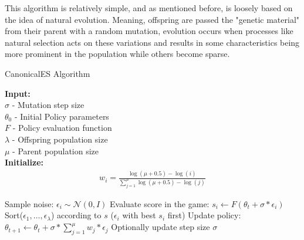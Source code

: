 \documentclass[11 pt, twocolumn]{article}
\begin{document}
This algorithm is relatively simple, and as mentioned before, is loosely based on the idea of natural evolution. Meaning, offspring are passed the "genetic material" from their parent with a random mutation, evolution occurs when processes like natural selection acts on these variations and results in some characteristics being more prominent in the population while others become sparse.

\begin{algorithm}
\scriptsize
\caption{CanonicalES Algorithm}\label{alg:canonical}
\hspace*{\algorithmicindent} \textbf{Input:} \\
\hspace*{\algorithmicindent} $\sigma$ - Mutation step size\\
\hspace*{\algorithmicindent} $\theta_0$ - Initial Policy parameters\\
\hspace*{\algorithmicindent} $F$ - Policy evaluation function\\
\hspace*{\algorithmicindent} $\lambda$ - Offspring population size\\
\hspace*{\algorithmicindent} $\mu$ - Parent population size\\
\hspace*{\algorithmicindent} \textbf{Initialize:}
\begin{align*}
  &w_i=\frac{\log{(\mu + 0.5)}-\log{(i)}}{\sum_{j=1}^{\mu} \log{(\mu + 0.5)}-\log{(j)}}&
\end{align*}
\begin{algorithmic}[1]
      	\State Sample noise: $\epsilon_i \sim \mathcal{N}(0,I)$
      	\State Evaluate score in the game: $s_i \gets F(\theta_t+\sigma*\epsilon_i)$
      	\EndFor
      	\State Sort($\epsilon_1,\dots,\epsilon_\lambda$) according to $s$ ($\epsilon_i$ with best $s_i$ first)
      	\State Update policy: $\theta_{t+1} \gets \theta_t + \sigma * \sum_{j=1}^{\mu} w_j*\epsilon_j$
      	\State Optionally update step size $\sigma$
      \EndFor
\end{algorithmic}
\end{algorithm}
\end{document}

